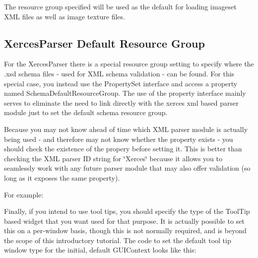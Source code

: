 The resource group specified will be used as the default for loading imageset X\+ML files as well as image texture files.\hypertarget{resprov_tutorial_resprov_tutorial_default_resource_groups_xc}{}\subsection{Xerces\+Parser Default Resource Group}\label{resprov_tutorial_resprov_tutorial_default_resource_groups_xc}
For the Xerces\+Parser there is a special resource group setting to specify where the .xsd schema files -\/ used for X\+ML schema validation -\/ can be found. For this special case, you instead use the Property\+Set interface and access a property named {\ttfamily Schema\+Default\+Resource\+Group}. The use of the property interface mainly serves to eliminate the need to link directly with the xerces xml based parser module just to set the default schema resource group.

Because you may not know ahead of time which X\+ML parser module is actually being used -\/ and therefore may not know whether the property exists -\/ you should check the existence of the propery before setting it. This is better than checking the X\+ML parser ID string for \char`\"{}\+Xerces\char`\"{} because it allows you to seamlessly work with any future parser module that may also offer validation (so long as it exposes the same property).

For example\+: 
\begin{DoxyCode}{0}
\end{DoxyCode}


Finally, if you intend to use tool tips, you should specify the type of the Tool\+Tip based widget that you want used for that purpose. It is actually possible to set this on a per-\/window basis, though this is not normally required, and is beyond the scope of this introductory tutorial. The code to set the default tool tip window type for the initial, default G\+U\+I\+Context looks like this\+: 
\begin{DoxyCode}{0}
\DoxyCodeLine{=======}
\DoxyCodeLine{\textcolor{comment}{// setup default group for validation schemas}}
\end{DoxyCode}


